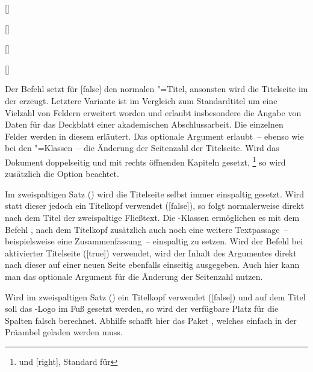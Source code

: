 \begin{Declaration}{}
\begin{Declaration}[v2.02]{%
  []
}
\begin{Declaration}[v2.02]{[\PSet]}
\begin{Declaration}[v2.02]{[\PSet]}
\begin{Declaration}[v2.02]{[\PBoolean]}
\begin{Declaration}{%
}
\printdeclarationlist%
%
%
%
%
Der Befehl  setzt für [false] den normalen 
\KOMAScript"=Titel{}, ansonsten wird die Titelseite im \CD der \TnUD 
erzeugt. Letztere Variante ist im Vergleich zum Standardtitel um eine Vielzahl 
von Feldern erweitert worden und erlaubt insbesondere die Angabe von Daten für 
das Deckblatt einer akademischen Abschlussarbeit. Die einzelnen Felder werden 
in diesem \autorefname erläutert. Das optionale Argument erlaubt~-- ebenso wie 
bei den \KOMAScript"=Klassen~-- die Änderung der Seitenzahl der Titelseite. 
Wird das Dokument doppelseitig und mit rechts öffnenden Kapiteln gesetzt,%
\footnote{%
   und [right], Standard für 
}
so wird zusätzlich die Option  beachtet.

Im zweispaltigen Satz () wird die Titelseite selbst immer
einspaltig gesetzt. Wird statt dieser jedoch ein Titelkopf verwendet 
([false]), so folgt normalerweise direkt nach dem Titel der 
zweispaltige Fließtext. Die \TUDScript-Klassen ermöglichen es mit dem Befehl 
, nach dem Titelkopf zusätzlich auch noch eine 
weitere Textpassage~-- beispielsweise eine Zusammenfassung~-- einspaltig zu 
setzen. Wird der Befehl bei aktivierter Titelseite ([true])
verwendet, wird der Inhalt des Argumentes direkt nach dieser auf einer neuen 
Seite ebenfalls einseitig ausgegeben. Auch hier kann man das optionale Argument 
für die Änderung der Seitenzahl nutzen.

Wird im zweispaltigen Satz () ein Titelkopf verwendet 
([false]) und auf dem Titel soll das \DDC-Logo im Fuß gesetzt 
werden, so wird der verfügbare Platz für die Spalten falsch berechnet. Abhilfe 
schafft hier das Paket , welches einfach in der Präambel 
geladen werden muss.
\end{Declaration}
\end{Declaration}
\end{Declaration}
\end{Declaration}
\end{Declaration}
\end{Declaration}

